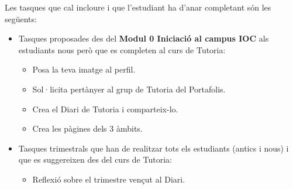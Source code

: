 \documentclass[twoside,a4paper,12pt]{refart}
\begin{document}
Les tasques que cal incloure i que l'estudiant ha d'anar completant són les següents:

\begin{itemize}
\item Tasques proposades des del \textbf{Modul 0 Iniciació al campus IOC} als estudiants nous però que es completen al curs de Tutoria:
\begin{itemize}
\item Posa la teva imatge al perfil.
\item Sol·licita pertànyer al grup de Tutoria del Portafolis.
\item Crea el Diari de Tutoria i comparteix-lo.
\item Crea les pàgines dels 3 àmbits.
\end{itemize}
\item Tasques trimestrals que han de realitzar tots els estudiants (antics i nous) i que es suggereixen des del curs de Tutoria:
\begin{itemize}
\item Reflexió sobre el trimestre vençut al Diari.
\end{itemize}
\end{itemize}
\end{document}
